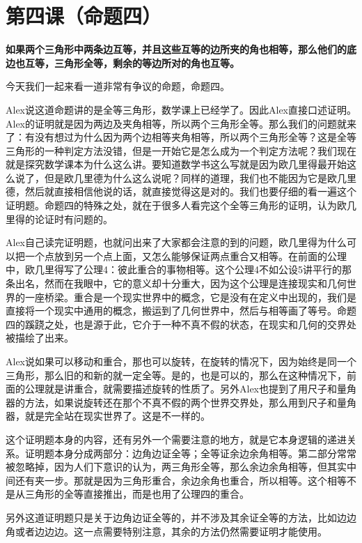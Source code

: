 \documentclass[
]{book}
\begin{document}
\hypertarget{ux7b2cux56dbux8bfeux547dux9898ux56db}{%
\chapter{第四课（命题四）}\label{ux7b2cux56dbux8bfeux547dux9898ux56db}}

\textbf{如果两个三角形中两条边互等，并且这些互等的边所夹的角也相等，那么他们的底边也互等，三角形全等，剩余的等边所对的角也互等。}

今天我们一起来看一道非常有争议的命题，命题四。

Alex说这道命题讲的是全等三角形，数学课上已经学了。因此Alex直接口述证明。Alex的证明就是因为两边及夹角相等，所以两个三角形全等。那么我们的问题就来了：有没有想过为什么因为两个边相等夹角相等，所以两个三角形全等？这是全等三角形的一种判定方法没错，但是一开始它是怎么成为一个判定方法呢？我们现在就是探究数学课本为什么这么讲。要知道数学书这么写就是因为欧几里得最开始这么说了，但是欧几里德为什么这么说呢？同样的道理，我们也不能因为它是欧几里德，然后就直接相信他说的话，就直接觉得这是对的。我们也要仔细的看一遍这个证明题。命题四的特殊之处，就在于很多人看完这个全等三角形的证明，认为欧几里得的论证时有问题的。

Alex自己读完证明题，也就问出来了大家都会注意的到的问题，欧几里得为什么可以把一个点放到另一个点上面，又怎么能够保证两点重合又相等。在前面的公理中，欧几里得写了公理4：彼此重合的事物相等。这个公理4不如公设5讲平行的那条出名，然而在我眼中，它的意义却十分重大，因为这个公理是连接现实和几何世界的一座桥梁。重合是一个现实世界中的概念，它是没有在定义中出现的，我们是直接将一个现实中通用的概念，搬运到了几何世界中，然后与相等画了等号。命题四的蹊跷之处，也是源于此，它介于一种不真不假的状态，在现实和几何的交界处被描绘了出来。

Alex说如果可以移动和重合，那也可以旋转，在旋转的情况下，因为始终是同一个三角形，那么旧的和新的就一定全等。是的，也是可以的，那么在这种情况下，前面的公理就是讲重合，就需要描述旋转的性质了。另外Alex也提到了用尺子和量角器的方法，如果说旋转还在那个不真不假的两个世界交界处，那么用到尺子和量角器，就是完全站在现实世界了。这是不一样的。

这个证明题本身的内容，还有另外一个需要注意的地方，就是它本身逻辑的递进关系。证明题本身分成两部分：边角边证全等；全等证余边余角相等。第二部分常常被忽略掉，因为人们下意识的认为，两三角形全等，那么余边余角相等，但其实中间还有夹一步。那就是因为三角形重合，余边余角也重合，所以相等。这个相等不是从三角形的全等直接推出，而是也用了公理四的重合。

另外这道证明题只是关于边角边证全等的，并不涉及其余证全等的方法，比如边边角或者边边边。这一点需要特别注意，其余的方法仍然需要证明才能使用。
\end{document}
